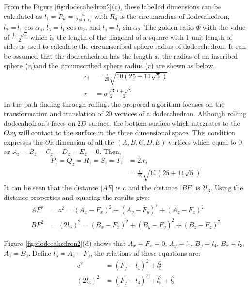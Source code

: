\noindent From the Figure \ref{fig:dodecahedron2}(c), these labelled dimensions can be calculated as $l_1 = R_d = \frac{a}{2\sin{\alpha_4}}$ with $R_d$ is the circumradius of dodecahedron, $l_2 = l_1\cos{\alpha_4}$, $l_3 = l_1\cos{\alpha_2}$, and $l_4 = l_1\sin{\alpha_2}$. 
The golden ratio $\Phi$ with the value of $\frac{1+\sqrt{5}}{2}$ which is the length of the diagonal of a square with $1$ unit length of sides is used to calculate the circumscribed sphere radius of dodecahedron. It can be assumed that the dodecahedron has the length $a$, the radius of an inscribed sphere ($r_i$)and the circumscribed sphere radius ($r$) are shown as below.
\begin{equation*}
\begin{split}
r_i &= \frac{a}{20}\sqrt{10(25+11\sqrt{5})}\\
r &= a\frac{\sqrt{3}}{2}\frac{1+\sqrt{5}}{2}
\end{split}
\end{equation*}
\noindent In the path-finding through rolling, the proposed algorithm focuses on the transformation and translation of $20$ vertices of a dodecahedron. 
Although rolling dodecahedron's faces on $2D$ surface, the bottom surface which integrates to the $Oxy$ will contact to the surface in the three dimensional space. 
This condition expresses the $Oz$ dimension of all the $(A,B,C,D,E)$ vertices which equal to $0$ or $A_z = B_z = C_z = D_z = E_z = 0$. 
Then, 
\begin{equation*} 
\label{equa:eq01}
\begin{split}
P_z = Q_z = R_z = S_z = T_z &= 2.r_i \\
							&= \frac{a}{10}\sqrt{10(25+11\sqrt{5})}
\end{split}
\end{equation*}
\noindent It can be seen that the distance $|AF|$ is $a$ and the distance $|BF|$ is $2l_3$. Using the distance properties and squaring the results give:
\begin{equation*} 
\label{dodeca:eq1}
\begin{split}
AF^2 & = a^2 = (A_x-F_x)^2 + (A_y-F_y)^2 + (A_z-F_z)^2 \\
BF^2 & = (2l_3)^2 = (B_x-F_x)^2 + (B_y-F_y)^2 + (B_z-F_z)^2
\end{split}
\end{equation*}

\noindent Figure \ref{fig:dodecahedron2}(d) shows that $A_x = F_x = 0$, $A_y = l_1$, $B_y = l_4$, $B_x = l_3$, $A_z = B_z$. Define $l_5=A_z-F_z$, the relations of these equations are:
\begin{equation*} 
\label{dodeca:eq2}
\begin{split}
a^2 & = (F_y-l_1)^2 + l_5^2\\
(2l_3)^2 & = (F_y-l_4)^2 + l_5^2 + l_3^2
\end{split}
\end{equation*}

